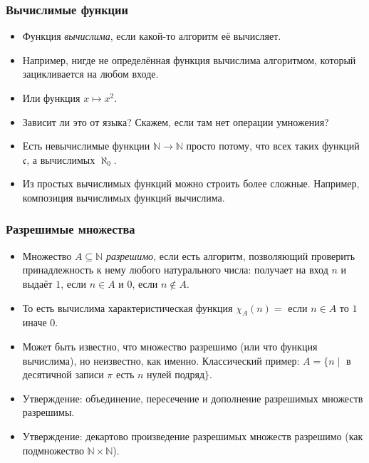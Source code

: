 \documentclass[10pt]{beamer}
\begin{document}
\begin{frame}
    \frametitle{Вычислимые функции}
    \begin{itemize}
        \item Функция \emph{вычислима}, если какой-то алгоритм её вычисляет.
        \item Например, нигде не определённая функция вычислима \pause алгоритмом, который зацикливается на любом входе.
        \pause
        \item Или функция $x \mapsto x^2$. 
        \item Зависит ли это от языка? \pause Скажем, если там нет операции умножения?
        \pause
        \item Есть невычислимые функции $\mathbb{N} \to \mathbb{N}$ \pause просто потому, что всех таких функций $\mathfrak{c}$, а вычислимых $\aleph_0$.
        \item Из простых вычислимых функций можно строить более сложные. Например, композиция вычислимых функций вычислима.
    \end{itemize}
\end{frame}

\begin{frame}
    \frametitle{Разрешимые множества}
    \begin{itemize}
        \item Множество $A \subseteq \mathbb{N}$ \emph{разрешимо}, если есть алгоритм, позволяющий проверить принадлежность к нему любого натурального числа: получает на вход $n$ и выдаёт $1$, если $n \in A$ и $0$, если $n \notin A$. 
        \item То есть вычислима характеристическая функция $\chi_A(n) = $ если $n \in A$ то $1$ иначе $0$.
        \pause
        \item Может быть известно, что множество разрешимо (или что функция вычислима), но неизвестно, как именно. Классический пример: $A = \{n \mid$ в десятичной записи $\pi$ есть $n$ нулей подряд$\}$.
        \pause
        \item Утверждение: объединение, пересечение и дополнение разрешимых множеств разрешимы.
        \item Утверждение: декартово произведение разрешимых множеств разрешимо (как подмножество $\mathbb{N} \times \mathbb{N}$).
    \end{itemize}
\end{frame}
\end{document}
